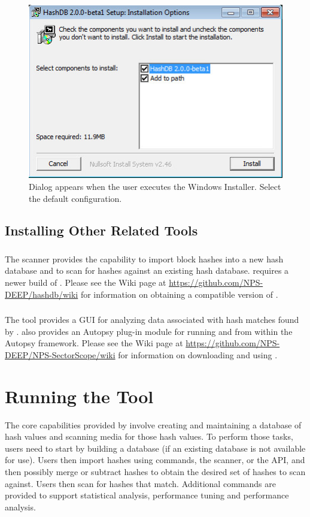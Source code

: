 \documentclass[11pt,fleqn]{article} %
\begin{document}
\begin{figure}
	\center
	\includegraphics[scale=.8]{WindowsInstaller.png}
	\caption{Dialog appears when the user executes the Windows Installer. Select the default configuration.}
	\label{fig:windowsInstaller}
\end{figure}

\subsection{Installing Other Related Tools}

\subsubsection{\bulk}
The \bulk \hdb scanner provides the capability to import block hashes into a new hash database and to scan for hashes against an existing hash database.
\hdb requires a newer build of \bulk.
Please see the \hdb Wiki page at \url{https://github.com/NPS-DEEP/hashdb/wiki}
for information on obtaining a compatible version of \bulk.

\subsubsection{\sscope}
The \sscope tool provides a GUI for analyzing data associated with hash matches found by \hdb.
\sscope also provides an Autopsy plug-in module for running \hdb and \sscope from within the Autopsy framework.
Please see the \sscope Wiki page at \url{https://github.com/NPS-DEEP/NPS-SectorScope/wiki}
for information on downloading and using \sscope.

\section {Running the \hdb Tool}
\label{Running}
The core capabilities provided by \hdb involve creating and maintaining a database of hash values and scanning media for those hash values. To perform those tasks, \hdb users need to start by building a database (if an existing database is not available for use).
Users then import hashes using \hdb commands, the \hdb \bulk scanner, or the \hdb API, and then possibly merge or subtract hashes to obtain the desired set of hashes to scan against.
Users then scan for hashes that match.
Additional commands are provided to support statistical analysis, performance tuning and performance analysis.\\
\end{document}
